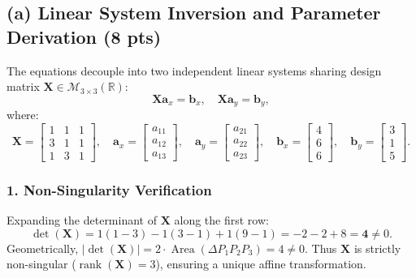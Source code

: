 \documentclass[11pt,a4paper]{article}
\begin{document}
\subsection{(a) Linear System Inversion and Parameter Derivation (8 pts)}
The equations decouple into two independent linear systems sharing design matrix $\mathbf{X} \in \mathcal{M}_{3 \times 3}(\mathbb{R})$:
\begin{equation}
\mathbf{X} \mathbf{a}_x = \mathbf{b}_x, \quad \mathbf{X} \mathbf{a}_y = \mathbf{b}_y,
\end{equation}
where:
\begin{equation}
\mathbf{X} = \begin{bmatrix} 1 & 1 & 1 \\ 3 & 1 & 1 \\ 1 & 3 & 1 \end{bmatrix}, \quad \mathbf{a}_x = \begin{bmatrix} a_{11} \\ a_{12} \\ a_{13} \end{bmatrix}, \quad \mathbf{a}_y = \begin{bmatrix} a_{21} \\ a_{22} \\ a_{23} \end{bmatrix}, \quad \mathbf{b}_x = \begin{bmatrix} 4 \\ 6 \\ 6 \end{bmatrix}, \quad \mathbf{b}_y = \begin{bmatrix} 3 \\ 1 \\ 5 \end{bmatrix}.
\end{equation}

\subsubsection{1. Non-Singularity Verification}
Expanding the determinant of $\mathbf{X}$ along the first row:
\begin{equation}
\det(\mathbf{X}) = 1(1 - 3) - 1(3 - 1) + 1(9 - 1) = -2 - 2 + 8 = \mathbf{4} \neq 0.
\end{equation}
Geometrically, $|\det(\mathbf{X})| = 2 \cdot \operatorname{Area}(\Delta P_1 P_2 P_3) = 4 \neq 0$. Thus $\mathbf{X}$ is strictly non-singular ($\operatorname{rank}(\mathbf{X}) = 3$), ensuring a unique affine transformation.
\end{document}
